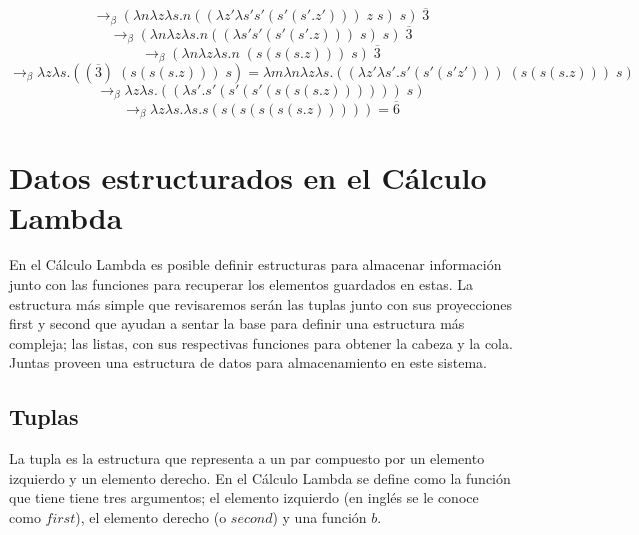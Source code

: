 \begin{exercise}
\[            \]
            \[
                    \rightarrow_\beta (\lambda n\lambda z\lambda s.n((\lambda z'\lambda s's'(s'(s'.z'))) \; z \; s) \; s )  \; \overline{3}
            \]
            \[
                    \rightarrow_\beta (\lambda n\lambda z\lambda s.n((\lambda s's'(s'(s'.z))) \; s) \; s )  \; \overline{3}
            \]
            \[
                    \rightarrow_\beta (\lambda n\lambda z\lambda s.n \; (s(s(s.z))) \; s )  \; \overline{3}
            \]
            \[
                    \rightarrow_\beta \lambda z\lambda s.((\overline{3}) \; (s(s(s.z))) \; s) = \lambda m\lambda n\lambda z\lambda s.(( \lambda z'\lambda s'.s'(s'(s'z'))) \; (s(s(s.z))) \; s)
            \]
            \[
                    \rightarrow_\beta \lambda z\lambda s.((\lambda s'.s'(s'(s'(s(s(s.z))))))  \; s)
            \]
            \[
                    \rightarrow_\beta \lambda z\lambda s.\lambda s.s(s(s(s(s(s.z))))) = \overline{6}
            \]
        \end{exercise}

        \section{Datos estructurados en el Cálculo Lambda}

            En el Cálculo Lambda es posible definir estructuras para almacenar información junto con las funciones para recuperar los elementos guardados en estas. La estructura más simple que revisaremos serán las tuplas junto con sus proyecciones \textsf{first} y \textsf{second} que ayudan a sentar la base para definir una estructura más compleja; las listas, con sus respectivas funciones para obtener la cabeza y la cola. Juntas proveen una estructura de datos para almacenamiento en este sistema.
    
            \subsection{Tuplas}

                La tupla es la estructura que representa a un par compuesto por un elemento izquierdo y un elemento derecho. En el Cálculo Lambda se define como la función que tiene tiene tres argumentos; el elemento izquierdo (en inglés se le conoce como $first$), el elemento derecho (o $second$) y una función $b$.
        
